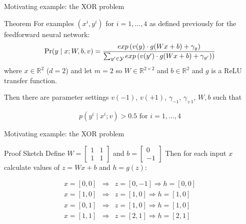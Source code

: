 \begin{frame}{Motivating example: the XOR problem}
\begin{block}{Theorem}
For examples $(x^i, y^i)$ for $i = 1,\ldots,4$ as defined previously for the feedforward neural network:
\[ \Pr(y \mid x; W, b, v) = \frac{exp\left(v(y) \cdot g(Wx + b) + \gamma_y \right)}{\sum_{y' \in {\cal Y}} exp\left(v(y') \cdot g(Wx + b) + \gamma_{y'})\right)} \]
where $x \in \mathbb{R}^2$ ($d=2$) and let $m=2$ so $W \in \mathbb{R}^{2\times2}$ and $b \in \mathbb{R}^2$ and $g$ is a ReLU transfer function.

\pause
Then there are parameter settings $v(-1)$, $v(+1)$, $\gamma_{-1}$, $\gamma_{+1}$, $W, b$ such that 

\[ p(y^i \mid x^i; v) > 0.5 \textrm{   for } i = 1, \ldots, 4 \]
\end{block}
\end{frame}

\begin{frame}{Motivating example: the XOR problem}
\begin{block}{Proof Sketch}
Define $W = \begin{bmatrix}
 1 & 1 \\
 1 & 1 
 \end{bmatrix}$ 
and $b = \begin{bmatrix} 0 \\ -1 \end{bmatrix}$
\pause
Then for each input $x$ calculate values of $z = Wx+b$ and $h=g(z)$:

\begin{eqnarray*}
x = [0,0] &\Rightarrow& z = [0,-1] \Rightarrow h = [0,0] \\
x = [1,0] &\Rightarrow& z = [1,0] \Rightarrow h = [1,0] \\
x = [0,1] &\Rightarrow& z = [1,0] \Rightarrow h = [1,0] \\
x = [1,1] &\Rightarrow& z = [2,1] \Rightarrow h = [2,1] 
\end{eqnarray*}
\end{block}
\end{frame}

